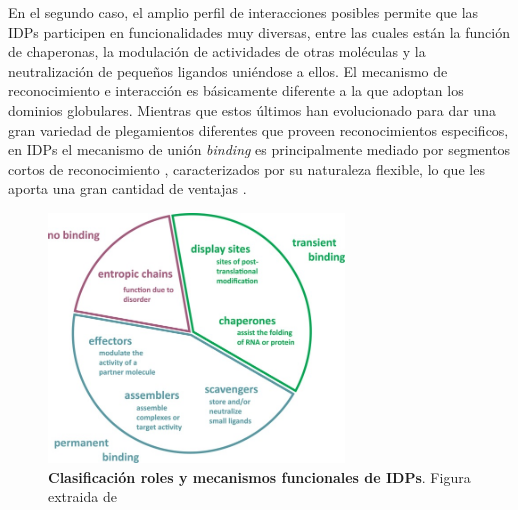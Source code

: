 En el segundo caso, el amplio perfil de interacciones posibles permite que las IDPs participen en funcionalidades muy diversas, entre las cuales están la función de chaperonas, 
la modulación de actividades de otras moléculas y la neutralización de pequeños ligandos uniéndose a ellos.
El mecanismo de reconocimiento e interacción es básicamente diferente a la que adoptan los dominios globulares. 
Mientras que estos últimos han evolucionado para dar una gran variedad de plegamientos diferentes que proveen reconocimientos especificos, 
en IDPs el mecanismo de unión \textit{binding} es principalmente mediado por segmentos cortos de reconocimiento \cite{neduva2005systematic,fuxreiter2007local}, caracterizados por su naturaleza flexible, lo que 
les aporta una gran cantidad de ventajas \cite{gunasekaran2003extended,dyson2005intrinsically}.%

% 
% 
% 



\begin{figure}[h!,centered]
\centering
\includegraphics[width=0.7\textwidth]{img/idpFunctionMechanisms.jpg} 
\caption{\textbf{Clasificación roles y mecanismos funcionales de IDPs}. Figura extraida de \cite{van2014classification}}
\label{idpFunctions}
\end{figure}


